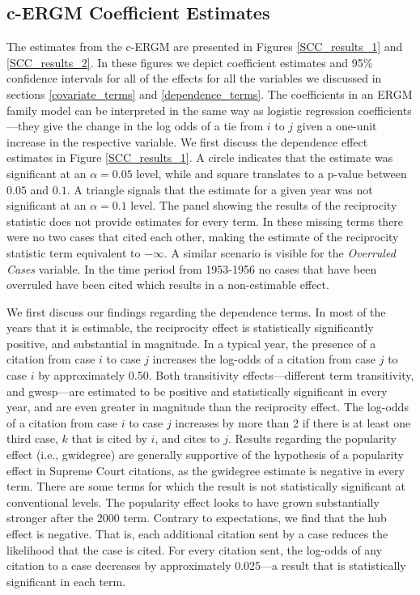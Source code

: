 \documentclass{cup-pan}
\begin{document}
  
\subsection{c-ERGM Coefficient Estimates}
The estimates from the c-ERGM are presented in Figures \ref{SCC_results_1} and \ref{SCC_results_2}. In these figures we depict coefficient estimates and 95\% confidence intervals for all of the effects for all the variables we discussed in sections \ref{covariate_terms} and \ref{dependence_terms}. The coefficients in an ERGM family model can be interpreted in the same way as logistic regression coefficients---they give the change in the log odds of a tie from $i$ to $j$ given a one-unit increase in the respective variable. We first discuss the dependence effect estimates in Figure \ref{SCC_results_1}. A circle indicates that the estimate was significant at an $\alpha=0.05$ level, while and square translates to a p-value between $0.05$ and $0.1$. A triangle signals that the estimate for a given year was not significant at an $\alpha=0.1$ level. The panel showing the results of the reciprocity statistic does not provide estimates for every term. In these missing terms there were no two cases that cited each other, making the estimate of the reciprocity statistic term equivalent to $-\infty$. %
A similar scenario is visible for the \textit{Overruled Cases} variable. In the time period from 1953-1956 no cases that have been overruled have been cited which results in a non-estimable effect.

We first discuss our findings regarding the dependence terms. In most of the years that it is estimable, the reciprocity effect is statistically significantly positive, and substantial in magnitude. In a typical year, the presence of a citation from case $i$ to case $j$ increases the log-odds of a citation from case $j$ to case $i$ by approximately 0.50. Both transitivity effects---different term transitivity, and gwesp---are estimated to be positive and statistically significant in every year, and are even greater in magnitude than the reciprocity effect. The log-odds of a citation from case $i$ to case $j$ increases by more than 2 if there is at least one third case, $k$ that is cited by $i$, and cites to $j$. Results regarding the popularity effect (i.e., gwidegree) are generally supportive of the hypothesis of a popularity effect in Supreme Court citations, as the gwidegree estimate is negative in every term. There are some terms for which the result is not statistically significant at conventional levels. The popularity effect looks to have grown substantially stronger after the 2000 term. Contrary to expectations, we find that the hub effect is negative. That is, each additional citation sent by a case reduces the likelihood that the case is cited. For every citation sent, the log-odds of any citation to a case decreases by approximately 0.025---a result that is statistically significant in each term.
\end{document}
